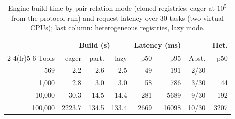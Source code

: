 \begin{table}[t]
\centering
\caption{Engine build time by pair-relation mode (cloned registries; eager at $10^5$ from the protocol run) and
request latency over 30 tasks (two virtual CPUs); last column: heterogeneous registries, lazy mode.}
\label{tab:ev-scale}
\scriptsize
\setlength{\tabcolsep}{3pt}
\begin{tabular}{@{}rrrrrrrr@{}}
\toprule
 & \multicolumn{3}{c}{Build (s)} & \multicolumn{2}{c}{Latency (ms)} & & Het. \\
\cmidrule(lr){2-4}\cmidrule(lr){5-6}
Tools & eager & part. & lazy & p50 & p95 & Abst. & p50 \\
\midrule
569 & 2.2 & 2.6 & 2.5 & 49 & 191 & 2/30 & -- \\
1,000 & 2.8 & 3.0 & 3.0 & 58 & 786 & 3/30 & 44 \\
10,000 & 30.3 & 14.5 & 14.4 & 281 & 5689 & 9/30 & 192 \\
100,000 & 2223.7 & 134.5 & 133.4 & 2669 & 16098 & 10/30 & 3207 \\
\bottomrule
\end{tabular}
\end{table}
